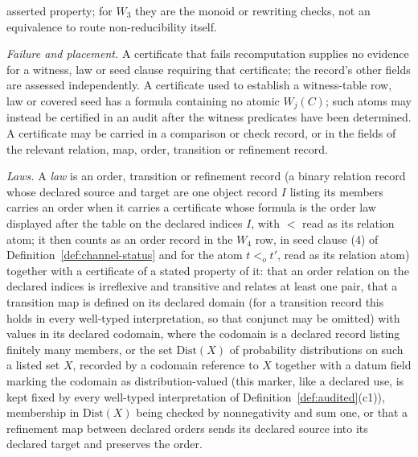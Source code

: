 \documentclass[11pt]{article}
\theoremstyle{definition}
\begin{document}
asserted property; for \(W_3\) they are the monoid or rewriting checks, not an
equivalence to route non-reducibility itself. \par\emph{Failure and placement.} A certificate that fails recomputation supplies no
evidence for a witness, law or seed clause requiring that certificate; the
record's other fields are assessed independently. A certificate used to
establish a witness-table row, law or covered seed has a formula containing no
atomic \(W_j(C)\); such atoms may instead be certified in an audit after the
witness predicates have been determined. A certificate may be
carried in a comparison or check record, or in the fields of the relevant
relation, map, order, transition or refinement record.
\par\emph{Laws.} A \emph{law} is an
order, transition or refinement record (a binary relation record whose declared source and target are one object record \(I\) listing its members carries an order when it carries a certificate whose formula is the order law displayed after the table on the declared indices \(I\), with \(<\) read as its relation atom; it then counts as an order record in the \(W_4\) row, in seed
clause (4) of Definition~\ref{def:channel-status} and for the atom
\(t<_o t'\), read as its relation atom) together with a certificate of a stated property of it: that an order relation on the
declared indices is irreflexive and transitive and relates at least one pair, that a transition map is
defined on its declared domain (for a transition record this holds in every well-typed interpretation, so that conjunct may be omitted) with values in its declared codomain, where the
codomain is a declared record listing finitely many members, or the set
\(\mathrm{Dist}(X)\) of probability distributions on such a listed set \(X\), recorded by a codomain
reference to \(X\) together with a datum field marking the codomain as
distribution-valued (this marker, like a declared use, is kept fixed by every
well-typed interpretation of Definition~\ref{def:audited}(c1)),
membership in \(\mathrm{Dist}(X)\) being checked by nonnegativity and sum one,
or that a
refinement map between declared orders sends its declared source into its declared target and preserves the order.
\end{document}
